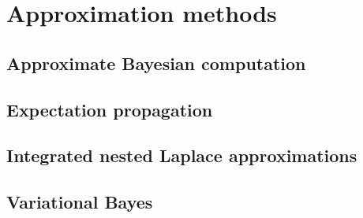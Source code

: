 \chapter{Approximation methods}\label{chap15}

\section{Approximate Bayesian computation}\label{sec15_1}

\section{Expectation propagation}\label{sec15_2}

\section{Integrated nested Laplace approximations}\label{sec15_3}

\section{Variational Bayes}\label{sec15_4}



